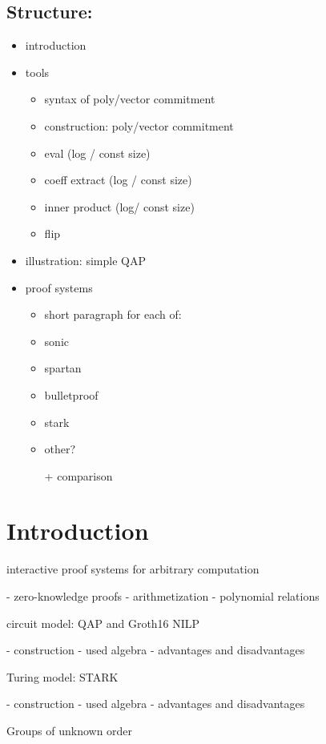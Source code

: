 \documentclass{article}
\begin{document}
\subsection*{Structure:}
\begin{itemize}
    \item introduction
    \item tools
    \begin{itemize}
        \item syntax of poly/vector commitment
        \item construction: poly/vector commitment
        \item eval (log / const size)
        \item coeff extract (log / const size)
        \item inner product (log/ const size)
        \item flip
    \end{itemize}
    \item illustration: simple QAP
    \item proof systems
    \begin{itemize}
        \item short paragraph for each of:
        \item sonic
        \item spartan
        \item bulletproof
        \item stark
        \item other?
        \item[+] comparison
    \end{itemize}
\end{itemize}

\section{Introduction}

interactive proof systems for arbitrary computation

 - zero-knowledge proofs
 - arithmetization
 - polynomial relations
 
circuit model: QAP and Groth16 NILP

 - construction
 - used algebra
 - advantages and disadvantages
 
Turing model: STARK

 - construction
 - used algebra
 - advantages and disadvantages

Groups of unknown order
\end{document}
